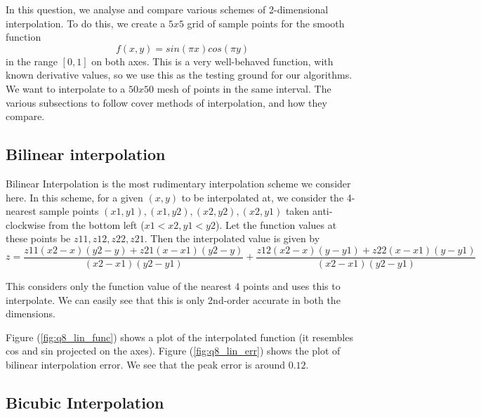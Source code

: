 \documentclass[11pt]{article}
\begin{document}
In this question, we analyse and compare various schemes of 2-dimensional interpolation. To do this, we create a $5x5$ grid of sample points for the smooth function
\begin{equation}
f(x,y) = sin(\pi x)cos(\pi y)
\end{equation}
in the range $[0,1]$ on both axes. This is a very well-behaved function, with known derivative values, so we use this as the testing ground for our algorithms. We want to interpolate to a $50x50$ mesh of points in the same interval. The various subsections to follow cover methods of interpolation, and how they compare.

\subsection{Bilinear interpolation}
Bilinear Interpolation is the most rudimentary interpolation scheme we consider here. In this scheme, for a given $(x,y)$ to be interpolated at, we consider the 4-nearest sample points $(x1,y1),(x1,y2),(x2,y2),(x2,y1)$ taken anti-clockwise from the bottom left ($x1<x2,y1<y2$). Let the function values at these points be $z11,z12,z22,z21$. Then the interpolated value is given by 
\begin{equation}
z=\frac{z11(x2-x)(y2-y)+z21(x-x1)(y2-y)}{(x2-x1)(y2-y1)}+\frac{z12(x2-x)(y-y1)+z22(x-x1)(y-y1)}{(x2-x1)(y2-y1)}
\end{equation}

This considers only the function value of the nearest 4 points and uses this to interpolate. We can easily see that this is only 2nd-order accurate in both the dimensions. 

Figure (\ref{fig:q8_lin_func}) shows a plot of the interpolated function (it resembles cos and sin projected on the axes). Figure (\ref{fig:q8_lin_err}) shows the plot of bilinear interpolation error. We see that the peak error is around $0.12$.

\pagebreak

\subsection{Bicubic Interpolation}
\end{document}
